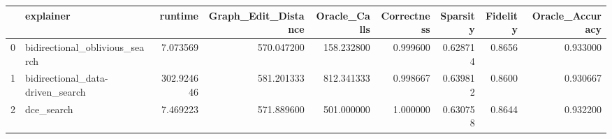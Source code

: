 \begin{tabular}{llrrrrrrr}
\toprule
{} &                         explainer &     runtime &  Graph\_Edit\_Distance &  Oracle\_Calls &  Correctness &  Sparsity &  Fidelity &  Oracle\_Accuracy \\
\midrule
0 &    bidirectional\_oblivious\_search &    7.073569 &           570.047200 &    158.232800 &     0.999600 &  0.628714 &    0.8656 &         0.933000 \\
1 &  bidirectional\_data-driven\_search &  302.924646 &           581.201333 &    812.341333 &     0.998667 &  0.639812 &    0.8600 &         0.930667 \\
2 &                        dce\_search &    7.469223 &           571.889600 &    501.000000 &     1.000000 &  0.630758 &    0.8644 &         0.932200 \\
\bottomrule
\end{tabular}

